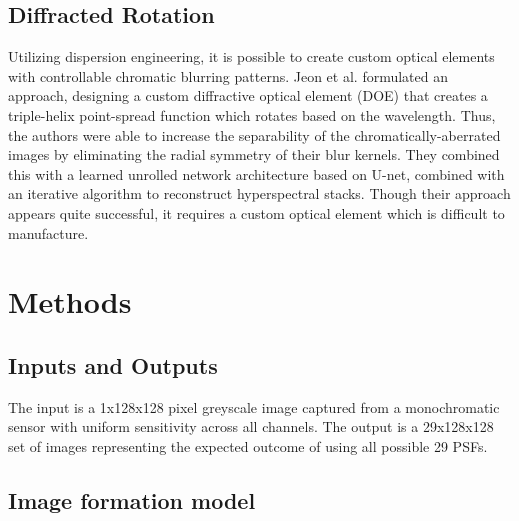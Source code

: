\documentclass{article}
\begin{document}
\subsection{Diffracted Rotation}
Utilizing dispersion engineering, it is possible to create custom optical elements with controllable chromatic blurring patterns. Jeon et al. \cite{jeon2019compact} formulated an approach, designing a custom diffractive optical element (DOE) that creates a triple-helix point-spread function which rotates based on the wavelength. Thus, the authors were able to increase the separability of the chromatically-aberrated images by eliminating the radial symmetry of their blur kernels. They combined this with a learned unrolled network architecture based on U-net, combined with an iterative algorithm to reconstruct hyperspectral stacks. Though their approach appears quite successful, it requires a custom optical element which is difficult to manufacture.

\section{Methods}

\subsection{Inputs and Outputs}

The input is a 1x128x128 pixel greyscale image captured from a monochromatic sensor with uniform sensitivity across all channels. The output is a 29x128x128 set of images representing the expected outcome of using all possible 29 PSFs.

\subsection{Image formation model}
\end{document}
